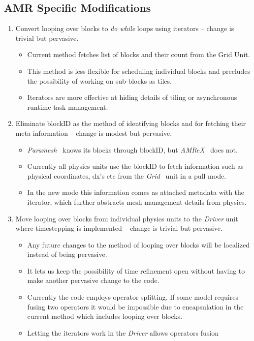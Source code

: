 \documentclass{article}
\newcommand{\amrex}{{\it AMReX}}
\newcommand{\paramesh}{{\it Paramesh}}
\newcommand{\grid}{{\it Grid}}
\newcommand{\driver}{{\it Driver}\xspace}
\begin{document}
\subsection{AMR Specific Modifications}
\label{sec:amr}
\begin{enumerate}
\item Convert looping over blocks to {\it do while} loops using
iterators -- change is trivial but pervasive.
\begin{itemize}
\item Current method fetches list of blocks and their count from the Grid Unit.
\item This method is less flexible for scheduling individual blocks
and precludes the possibility of working on sub-blocks as tiles.
\item Iterators are more effective at hiding details of tiling or
asynchronous runtime task management. 
\end{itemize}
\item Eliminate blockID as the method of identifying blocks and for
fetching their meta information -- change is modest but pervasive.
\begin{itemize}
\item \paramesh~ knows its blocks through blockID, but \amrex~ does not.
\item Currently all physics units use the blockID to fetch information
such as physical coordinates, dx's etc from the \grid~ unit in a pull
mode. 
\item In the new mode this information comes as attached metadata with
the iterator, which further abstracts mesh management details from physics.
\end{itemize}
\item Move looping over blocks from individual physics units to the
\driver unit where timestepping is implemented -- change is trivial
but pervasive.
\begin{itemize}
\item Any future changes to the method of looping over blocks will be localized instead
of being pervasive.
\item It lets us keep the possibility of time refinement open without
having to make another pervasive change to the code.
\item Currently the code employs operator splitting. If some model
requires fusing two operators it would be impossible due to
encapsulation in the current method which includes looping over blocks.
\item Letting the iterators work in the \driver allows operators fusion

\end{itemize}
\end{enumerate}
\end{document}
